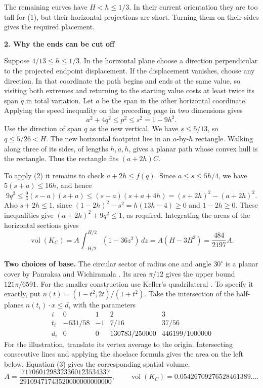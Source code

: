 \documentclass[11pt,letterpaper]{article}
\newcommand{\heading}[1]{{\large\sffamily\bfseries\color{ink}#1}\par\smallskip}
\newcommand{\term}[1]{\textbf{\color{ink}#1}}
\DeclareMathOperator{\vol}{vol}
\begin{document}
The remaining curves have \(H<h\le1/3\). In their current orientation they are too tall for (1), but their horizontal projections are short. Turning them on their sides gives the required placement.

\newpage
\heading{2. Why the ends can be cut off}
Suppose \(4/13\le h\le1/3\). In the horizontal plane choose a direction perpendicular to the projected endpoint displacement. If the displacement vanishes, choose any direction. In that coordinate the path begins and ends at the same value, so visiting both extremes and returning to the starting value costs at least twice its span \(q\) in total variation. Let \(a\) be the span in the other horizontal coordinate. Applying the speed inequality on the preceding page in two dimensions gives
\[
 a^2+4q^2\le p^2\le s^2=1-9h^2.
\]
Use the direction of span \(q\) as the new vertical. We have \(s\le5/13\), so \(q\le5/26<H\). The new horizontal footprint lies in an \(a\)-by-\(h\) rectangle. Walking along three of its sides, of lengths \(h,a,h\), gives a planar path whose convex hull is the rectangle. Thus the rectangle fits \((a+2h)C\).

To apply (2) it remains to check \(a+2h\le f(q)\). Since \(a\le s\le5h/4\), we have \(5(s+a)\le16h\), and hence
\[
9q^2\le\tfrac94(s-a)(s+a)
   \le(s-a)(s+a+4h)
   =(s+2h)^2-(a+2h)^2.
\]
Also \(s+2h\le1\), since \((1-2h)^2-s^2=h(13h-4)\ge0\) and \(1-2h\ge0\). These inequalities give \((a+2h)^2+9q^2\le1\), as required. Integrating the areas of the horizontal sections gives
\[
 \vol(K_C)=A\int_{-H/2}^{H/2}(1-36z^2)\,dz
      = A(H-3H^3)=\frac{484}{2197}A.\tag{3}
\]

\term{Two choices of base.} The circular sector of radius one and angle \(30^\circ\) is a planar cover by Panraksa and Wichiramala \cite{sector}. Its area \(\pi/12\) gives the upper bound \(121\pi/6591\). For the smaller construction use Keller's quadrilateral \cite[Theorem 4.1]{Keller}. To specify it exactly, put \(n(t)=(1-t^2,2t)/(1+t^2)\). Take the intersection of the half-planes \(n(t_i)\cdot x\le d_i\) with the parameters
\[
\begin{array}{c|rrrr}
 i&0&1&2&3\\ \hline
 t_i&-631/58&-1&7/16&37/56\\
 d_i&0&0&130783/250000&446199/1000000
\end{array}
\]
For the illustration, translate its vertex average to the origin. Intersecting consecutive lines and applying the shoelace formula gives the area on the left below. Equation (3) gives the corresponding spatial volume.
\[
A=\frac{7170601298323360123534337}{29109471743520000000000000},
\qquad
\vol(K_C)=0.05426709276528461389\ldots.
\]
\end{document}

